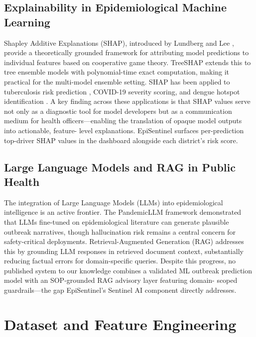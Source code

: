 \documentclass[conference]{IEEEtran}
\begin{document}
\subsection{Explainability in Epidemiological Machine Learning}

Shapley Additive Explanations (SHAP), introduced by Lundberg and Lee
\cite{lundberg2017}, provide a theoretically grounded framework for
attributing model predictions to individual features based on
cooperative game theory. TreeSHAP \cite{lundberg2020} extends this to
tree ensemble models with polynomial-time exact computation, making
it practical for the multi-model ensemble setting. SHAP has been
applied to tuberculosis risk prediction \cite{iitm2025}, COVID-19
severity scoring, and dengue hotspot identification
\cite{bangladesh_xai2025}. A key finding across these applications is
that SHAP values serve not only as a diagnostic tool for model
developers but as a communication medium for health officers---enabling
the translation of opaque model outputs into actionable, feature-
level explanations. EpiSentinel surfaces per-prediction top-driver
SHAP values in the dashboard alongside each district's risk score.

\subsection{Large Language Models and RAG in Public Health}

The integration of Large Language Models (LLMs) into epidemiological
intelligence is an active frontier. The PandemicLLM framework
\cite{frontiersai2025} demonstrated that LLMs fine-tuned on
epidemiological literature can generate plausible outbreak
narratives, though hallucination risk remains a central concern
for safety-critical deployments. Retrieval-Augmented Generation (RAG)
\cite{rag_healthcare2025} addresses this by grounding LLM responses
in retrieved document context, substantially reducing factual errors
for domain-specific queries. Despite this progress, no published
system to our knowledge combines a validated ML outbreak prediction
model with an SOP-grounded RAG advisory layer featuring domain-
scoped guardrails---the gap EpiSentinel's Sentinel AI component
directly addresses.

\section{Dataset and Feature Engineering}
\label{sec:data}
\end{document}
